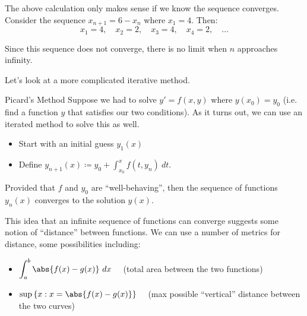 The above calculation only makes sense if we know the sequence converges. Consider the sequence $x_{n+1} = 6 - x_n$ where $x_1 = 4$. Then:
\[ x_1 = 4,\quad x_2 = 2,\quad x_3 = 4,\quad x_4 = 2,\quad \ldots \]


Since this sequence does not converge, there is no limit when $n$ approaches infinity.


Let's look at a more complicated iterative method.

\begin{exbox}{Picard's Method}{}
    Suppose we had to solve $y\prime = f(x,y)$ where $y(x_0) = y_0$ (i.e. find a function $y$ that satisfies our two conditions). As it turns out, we can use an iterated method to solve this as well.
    \begin{itemize}
        \item Start with an initial guess $y_1(x)$
        \item Define $\displaystyle y_{n+1}(x) \coloneq y_0 + \int_{x_0}^{x} f(t, y_n)\ dt$.
    \end{itemize}
    Provided that $f$ and $y_0$ are ``well-behaving'', then the sequence of functions $y_n(x)$ converges to the solution $y(x)$.
\end{exbox}

This idea that an infinite sequence of functions can converge suggests some notion of ``distance'' between functions. We can use a number of metrics for distance, some possibilities including:
\begin{itemize}
    \item \( \displaystyle \int_a^b \abs{f(x) - g(x)}\ dx \quad \) (total area between the two functions)
    \item \( \displaystyle \sup \left\{ x : x = \abs{f(x) - g(x)} \right\} \quad \) (max possible ``vertical'' distance between the two curves)
\end{itemize}
